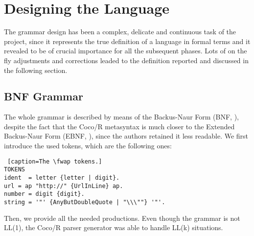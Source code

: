 \chapter{\label{chapter2} Designing the Language}

The grammar design has been a complex, delicate and continuous task of the project, since it represents the true definition of a language in formal terms and it revealed to be of crucial importance for all the subsequent phases. Lots of on the fly adjustments and corrections leaded to the definition reported and discussed in the following section.

\section{BNF Grammar}

The whole grammar is described by means of the Backus-Naur Form (BNF, \cite{bnf}), despite the fact that the Coco/R metasyntax is much closer to the Extended Backus-Naur Form (EBNF, \cite{ebnf}), since the authors retained it less readable.  We first introduce the used tokens, which are the following ones:\\

\begin{lstlisting} [caption=The \fwap tokens.]
TOKENS
ident  = letter {letter | digit}.
url = ap "http://" {UrlInLine} ap.
number = digit {digit}.
string = '"' {AnyButDoubleQuote | "\\\""} '"'.
\end{lstlisting}

Then, we provide all the needed productions. Even though the grammar is not LL(1), the Coco/R parser generator was able to handle LL(k) situations.

